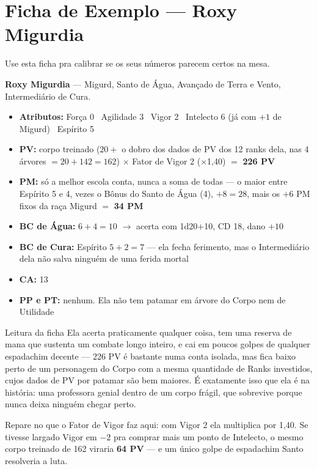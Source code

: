 \chapter{Ficha de Exemplo --- Roxy Migurdia}

Use esta ficha pra calibrar se os seus números parecem certos na mesa.

\textbf{Roxy Migurdia} --- Migurd, Santo de Água, Avançado de Terra e Vento, Intermediário
de Cura.

\begin{itemize}
    \item \textbf{Atributos:} Força 0 \textbullet\ Agilidade 3 \textbullet\ Vigor 2
          \textbullet\ Intelecto 6 (já com $+1$ de Migurd) \textbullet\ Espírito 5
    \item \textbf{PV:} corpo treinado ($20 + $ o dobro dos dados de PV dos 12 ranks dela,
          nas 4 árvores $= 20 + 142 = 162$) $\times$ Fator de Vigor 2 ($\times$1,40) $=$
          \textbf{226 PV}
    \item \textbf{PM:} só a melhor escola conta, nunca a soma de todas --- o maior entre
          Espírito 5 e 4, vezes o Bônus do Santo de Água (4), $+8 = 28$, mais os $+6$ PM
          fixos da raça Migurd $=$ \textbf{34 PM}
    \item \textbf{BC de Água:} $6 + 4 = 10$ $\to$ acerta com 1d20$+$10, CD 18, dano $+10$
    \item \textbf{BC de Cura:} Espírito $5 + 2 = 7$ --- ela fecha ferimento, mas o
          Intermediário dela não salva ninguém de uma ferida mortal
    \item \textbf{CA:} 13
    \item \textbf{PP e PT:} nenhum. Ela não tem patamar em árvore do Corpo nem de Utilidade
\end{itemize}

\begin{nota}{Leitura da ficha}
    Ela acerta praticamente qualquer coisa, tem uma reserva de mana que sustenta um combate
    longo inteiro, e cai em poucos golpes de qualquer espadachim decente --- 226 PV é bastante
    numa conta isolada, mas fica baixo perto de um personagem do Corpo com a mesma quantidade
    de Ranks investidos, cujos dados de PV por patamar são bem maiores. É exatamente isso que
    ela é na história: uma professora genial dentro de um corpo frágil, que sobrevive porque
    nunca deixa ninguém chegar perto.

    \medskip
    Repare no que o Fator de Vigor faz aqui: com Vigor 2 ela multiplica por 1,40. Se tivesse
    largado Vigor em $-2$ pra comprar mais um ponto de Intelecto, o mesmo corpo treinado de
    162 viraria \textbf{64 PV} --- e um único golpe de espadachim Santo resolveria a luta.
\end{nota}

